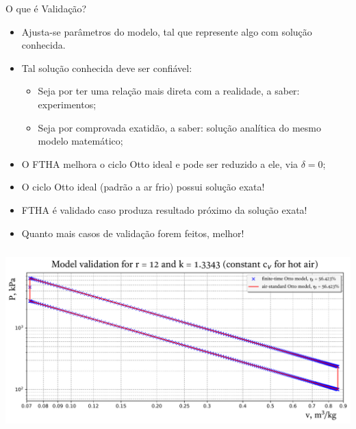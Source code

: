    \begin{frame}{O que é Validação?}\vspace*{-2em}
        \begin{itemize}
            \item<2-> Ajusta-se \alert{parâmetros} do modelo, tal que represente algo com
                \alert{solução conhecida}.
            \item<3-> Tal solução conhecida deve ser \alert{confiável}:
                \begin{itemize}
                    \item<4-> Seja por ter uma relação mais direta com a \alert{realidade}, a
                        saber: \alert{experimentos};
                    \item<5-> Seja por comprovada exatidão, a saber: \alert{solução analítica}
                        do mesmo \alert{modelo matemático};
                \end{itemize}
            \item<6-> O FTHA melhora o \alert{ciclo Otto ideal} e \alert{pode ser reduzido} a
                ele, via \alert{$\delta=0$};
            \item<7-> O ciclo Otto ideal (padrão a ar frio) possui \alert{solução exata}!
            \item<8-> FTHA é validado caso produza \alert{resultado próximo} da solução exata!
            \item<9-> Quanto \alert{mais casos} de validação forem feitos, melhor!
        \end{itemize}
    \end{frame}

    \begin{frame}{}\vspace*{-2em}
        \begin{center}
            \includegraphics[height=70.0mm]{fig/val_r=12,0_k=1,334.pdf}
        \end{center}
    \end{frame}

